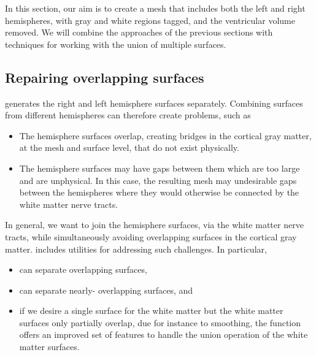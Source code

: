 In this section, our aim is to create a mesh that includes both the
left and right hemispheres, with gray and white regions tagged, and
the ventricular volume removed. We will combine the approaches of the
previous sections with \svmtk{} techniques for
working with the union of multiple surfaces. 

\subsection{Repairing overlapping surfaces}
\freesurfer{} generates the right and left hemisphere surfaces
separately. Combining surfaces from different hemispheres
can therefore create problems, such as
\begin{itemize}
\item The hemisphere surfaces overlap, creating bridges in the cortical gray 
matter, at the mesh and surface level, that do not exist physically.
\item The hemisphere surfaces may have gaps between them which are too large 
and are unphysical. In this case, the resulting mesh may undesirable gaps 
between the hemispheres where they would otherwise be connected by the 
white matter nerve tracts.  
\end{itemize} 
In general, we want to join the hemisphere surfaces, via the white matter 
nerve tracts, while simultaneously avoiding overlapping surfaces in the 
cortical gray matter.  %
\svmtk{} includes utilities for addressing such challenges. In particular,
\begin{itemize}
\item
   can separate
  overlapping surfaces,
\item
   can separate nearly-%
  overlapping surfaces, and
\item
  if we desire a single surface for the white matter but the white matter 
  surfaces only partially overlap, due for instance to smoothing, the 
  \svmtk{} function  
  offers an improved set of features to handle the union operation of 
  the white matter surfaces.
%
% 
\end{itemize}
